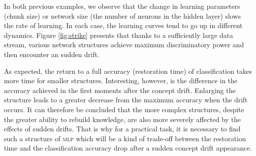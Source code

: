 In both previous examples, we observe that the change in learning parameters (chunk size) or network  size (the number of neurons in the hidden layer) slows the rate of learning. In each case, the learning curves tend to go up in different dynamics. Figure \ref{fig:strike} presents that thanks to a sufficiently large data stream, various network structures achieve maximum discriminatory power and then encounter an sudden drift.



As expected, the return to a full accuracy (restoration time) of classification takes more time for smaller structures. Interesting, however, is the difference in the accuracy achieved in the first moments after the concept drift. Enlarging the structure leads to a greater decrease from the maximum accuracy when the drift occurs. It can therefore be concluded that the more complex structures, despite the greater ability to rebuild knowledge, are also more severely affected by the effects of sudden drifts. That is why for a practical task, it is necessary to find such a structure of \textsc{mlp} which will be a kind of trade-off between the restoration time and the classification accuracy drop after a sudden concept drift appearance. 
